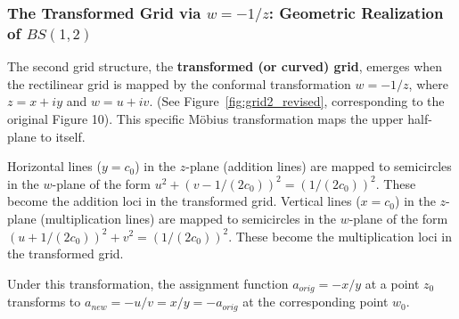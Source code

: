 \subsubsection{The Transformed Grid via $w = -1/z$: Geometric Realization of $BS(1,2)$}
The second grid structure, the \textbf{transformed (or curved) grid}, emerges when the rectilinear grid is mapped by the conformal transformation $w = -1/z$, where $z=x+iy$ and $w=u+iv$. (See Figure~\ref{fig:grid2_revised}, corresponding to the original Figure 10). This specific M\"obius transformation maps the upper half-plane to itself.

Horizontal lines ($y=c_0$) in the $z$-plane (addition lines) are mapped to semicircles in the $w$-plane of the form $u^2 + (v - 1/(2c_0))^2 = (1/(2c_0))^2$. These become the addition loci in the transformed grid.
Vertical lines ($x=c_0$) in the $z$-plane (multiplication lines) are mapped to semicircles in the $w$-plane of the form $(u + 1/(2c_0))^2 + v^2 = (1/(2c_0))^2$. These become the multiplication loci in the transformed grid.

Under this transformation, the assignment function $a_{orig} = -x/y$ at a point $z_0$ transforms to $a_{new} = -u/v = x/y = -a_{orig}$ at the corresponding point $w_0$.


